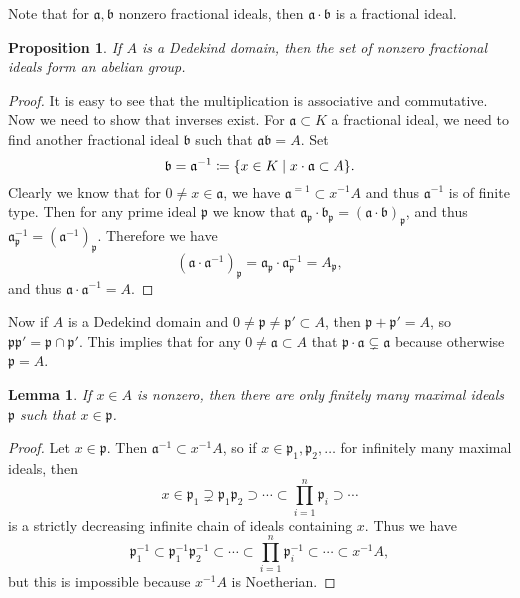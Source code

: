 \documentclass[leqno, openany]{memoir}
\newtheorem{prop}[thm]{Proposition}
\newtheorem{lem}[thm]{Lemma}
\theoremstyle{definition}
\theoremstyle{remark}
\theoremstyle{plain}
\theoremstyle{definition}
\theoremstyle{remark}
\newcommand{\mf}[1]{\mathfrak{#1}}
\begin{document}
Note that for $\mf{a}, \mf{b}$ nonzero fractional ideals, then $\mf{a} \cdot \mf{b}$ is a fractional ideal.

\begin{prop}
    If $A$ is a Dedekind domain, then the set of nonzero fractional ideals form an abelian group.
\end{prop}

\begin{proof}
    It is easy to see that the multiplication is associative and commutative. Now we need to show that inverses exist. For $\mf{a} \subset K$ a fractional ideal, we need to find another fractional ideal $\mf{b}$ such that $\mf{a} \mf{b} = A$. Set
    \[ \mf{b} = \mf{a}^{-1} \coloneqq \qty{ x \in K \mid x \cdot \mf{a} \subset A }. \]
    Clearly we know that for $0 \neq x \in \mf{a}$, we have $\mf{a}^{=1} \subset x^{-1}A$ and thus $\mf{a}^{-1}$ is of finite type. Then for any prime ideal $\mf{p}$ we know that $\mf{a}_{\mf{p}} \cdot \mf{b}_{\mf{p}} = (\mf{a \cdot b})_{\mf{p}}$, and thus $\mf{a}_{\mf{p}}^{-1} = (\mf{a}^{-1})_{\mf{p}}$. Therefore we have
    \[ (\mf{a} \cdot \mf{a}^{-1})_{\mf{p}} = \mf{a}_{\mf{p}} \cdot \mf{a}_{\mf{p}}^{-1} = A_{\mf{p}}, \]
    and thus $\mf{a} \cdot \mf{a}^{-1} = A$.
\end{proof}

Now if $A$ is a Dedekind domain and $0 \neq \mf{p} \neq \mf{p}' \subset A$, then $\mf{p} + \mf{p}' = A$, so $\mf{p} \mf{p}' = \mf{p} \cap \mf{p}'$. This implies that for any $0 \neq \mf{a} \subset A$ that $\mf{p} \cdot \mf{a} \subsetneq \mf{a}$ because otherwise $\mf{p} = A$.

\begin{lem}
    If $x \in A$ is nonzero, then there are only finitely many maximal ideals $\mf{p}$ such that $x \in \mf{p}$.
\end{lem}

\begin{proof}
    Let $x \in \mf{p}$. Then $\mf{a}^{-1} \subset x^{-1}A$, so if $x \in \mf{p}_1, \mf{p}_2, \ldots$ for infinitely many maximal ideals, then 
    \[ x \in \mf{p}_1 \supsetneq \mf{p}_1 \mf{p}_2 \supset \cdots \subset \prod_{i=1}^n \mf{p}_i \supset \cdots \] 
    is a strictly decreasing infinite chain of ideals containing $x$. Thus we have
    \[ \mf{p}_1^{-1} \subset \mf{p}_1^{-1} \mf{p}_2^{-1} \subset \cdots \subset \prod_{i=1}^n \mf{p}_i^{-1} \subset \cdots \subset  x^{-1} A, \]
    but this is impossible because $x^{-1}A$ is Noetherian.
\end{proof}
\end{document}
